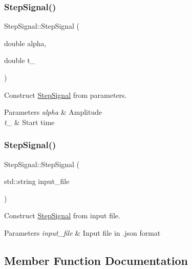 \subsubsection{\texorpdfstring{Step\+Signal()}{StepSignal()}\hspace{0.1cm}{\footnotesize\ttfamily [1/2]}}
{\footnotesize\ttfamily Step\+Signal\+::\+Step\+Signal (\begin{DoxyParamCaption}\item[{double}]{alpha,  }\item[{double}]{t\+\_ }\end{DoxyParamCaption})}



Construct \hyperlink{classStepSignal}{Step\+Signal} from parameters. 


\begin{DoxyParams}{Parameters}
{\em alpha} & Amplitude \\
\hline
{\em t\+\_} & Start time \\
\hline
\end{DoxyParams}
\mbox{\label{classStepSignal_ac295a21796206a794dbf3c65dad2d75e}} 
\subsubsection{\texorpdfstring{Step\+Signal()}{StepSignal()}\hspace{0.1cm}{\footnotesize\ttfamily [2/2]}}
{\footnotesize\ttfamily Step\+Signal\+::\+Step\+Signal (\begin{DoxyParamCaption}\item[{std\+::string}]{input\+\_\+file }\end{DoxyParamCaption})}



Construct \hyperlink{classStepSignal}{Step\+Signal} from input file. 


\begin{DoxyParams}{Parameters}
{\em input\+\_\+file} & Input file in .json format \\
\hline
\end{DoxyParams}


\subsection{Member Function Documentation}
\mbox{\label{classStepSignal_a04b7f029bb2b53c9b63003b0d6b4360a}} 
